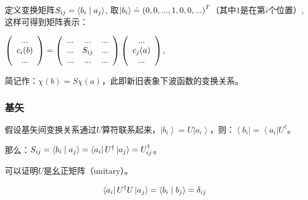 定义变换矩阵$S_{ij}  = \left\langle {{b_i }}
 \mathrel{\left | {\vphantom {{b_i } {a_j }}}
 \right. \kern-\nulldelimiterspace}
 {{a_j }} \right\rangle $, 取$\left| {b_i } \right\rangle  \buildrel\textstyle.\over= \left( {0,0,...,1,0,0,...} \right)^T $（其中$1$是在第$i$个位置）, 这样可得到矩阵表示：

$ \left( {\begin{array}{*{20}c}
   {...}  \\
   {c_i (b)}  \\
   {...}  \\
\end{array}} \right) = \left( {\begin{array}{*{20}c}
   {...} & {...} & {...}  \\
   {...} & {S_{ij} } & {...}  \\
   {...} & {...} & {...}  \\
\end{array}} \right)\left( {\begin{array}{*{20}c}
   {...}  \\
   {c_j (a)}  \\
   {...}  \\
\end{array}} \right)
$,

简记作：$\chi (b) = S \chi (a)$，此即新旧表象下波函数的变换关系。


\subsubsection{基矢}

假设基矢间变换关系通过$U$算符联系起来，$\left| b_i \right\rangle = U
\left| a_i \right\rangle$，则：$\left\langle {b_i } \right| =
\left\langle {a_i } \right|U^\dag  $。

那么：$S_{ij}  = \left\langle {{b_i }}
 \mathrel{\left | {\vphantom {{b_i } {a_j }}}
 \right. \kern-\nulldelimiterspace}
 {{a_j }} \right\rangle  = \left\langle {a_i } \right|U^\dag  \left| {a_j } \right\rangle  = U_{ij}^\dag  $。


可以证明$U$是幺正矩阵（unitary）。

\begin{equation*}
\left\langle {a_i }
\right|U^\dag  U\left| {a_j } \right\rangle  = \left\langle {{b_i }}
 \mathrel{\left | {\vphantom {{b_i } {b_j }}}
 \right. \kern-\nulldelimiterspace}
 {{b_j }} \right\rangle  = \delta _{ij}
\end{equation*}

